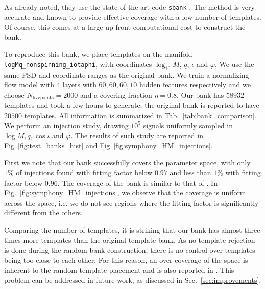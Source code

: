 \documentclass[twocolumn,showpacs,preprintnumbers,nofootinbib,prd,
superscriptaddress,10pt]{revtex4-2}
\begin{document}
As already noted, they use the state-of-the-art code \texttt{sbank} \cite{Ajith:2012mn, PhysRevD.80.104014}.
The method is very accurate and known to provide effective coverage with a low number of templates. Of course, this comes at a large up-front computational cost to construct the bank.

To reproduce this bank, we place templates on the manifold \texttt{logMq\_nonspinning\_iotaphi}, with coordinates $\log_{10}M$, $q$, $\iota$ and $\varphi$. We use the same PSD and coordinate ranges as the original bank.
We train a normalizing flow model with $4$ layers with $60, 60, 60, 10$ hidden features respectively and we choose $N_\text{livepoints} = 2000$ and a covering fraction $\eta = 0.8$.
Our bank has $58932$ templates and took a few hours to generate; the original bank is reported to have $20500$ templates.
All information is summarized in Tab.~\ref{tab:bank_comparison}.
We perform an injection study, drawing $10^5$ signals uniformly sampled in $\log M, q, \cos\iota$ and $\varphi$. The results of such study are reported in Fig~\ref{fig:test_banks_hist} and Fig~\ref{fig:symphony_HM_injections}.

First we note that our bank successfully covers the parameter space, with only $1\%$ of injections found with fitting factor below $0.97$ and less than $1\%$ with fitting factor below $0.96$. The coverage of the bank is similar to that of \cite{Harry:2017weg}.
In Fig.~\ref{fig:symphony_HM_injections}, we observe that the coverage is uniform across the space, i.e. we do not see regions where the fitting factor is significantly different from the others.

Comparing the number of templates, it is striking that our bank has almost three times more templates than the original template bank.
As no template rejection is done during the random bank construction, there is no control over templates being too close to each other. For this reason, an over-coverage of the space is inherent to the random template placement and is also reported in \cite{Messenger:2008ta,Coogan:2022qxs}. This problem can be addressed in future work, as discussed in Sec.~\ref{sec:improvements}.
\end{document}
